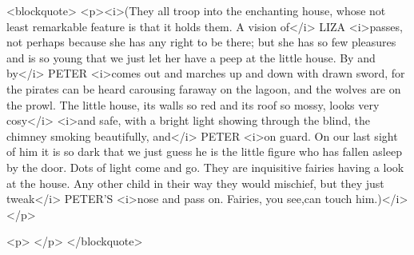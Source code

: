 <blockquote>
<p><i>(They all troop into the enchanting house, whose not least
remarkable feature is that it holds them. A vision of</i> LIZA
<i>passes, not perhaps because she has any right to be there; but she
has so few pleasures and is so young that we just let her have a peep
at the little house. By and by</i> PETER <i>comes out and marches up
and down with drawn sword, for the pirates can be heard carousing
faraway on the lagoon, and the wolves are on the prowl. The little
house, its walls so red and its roof so mossy, looks very cosy</i>
<i>and safe, with a bright light showing through the blind, the
chimney smoking beautifully, and</i> PETER <i>on guard. On our last
sight of him it is so dark that we just guess he is the little figure
who has fallen asleep by the door. Dots of light come and go. They
are inquisitive fairies having a look at the house. Any other child
in their way they would mischief, but they just tweak</i> PETER'S
<i>nose and pass on. Fairies, you see,can touch him.)</i></p>

<p> </p>
</blockquote>
